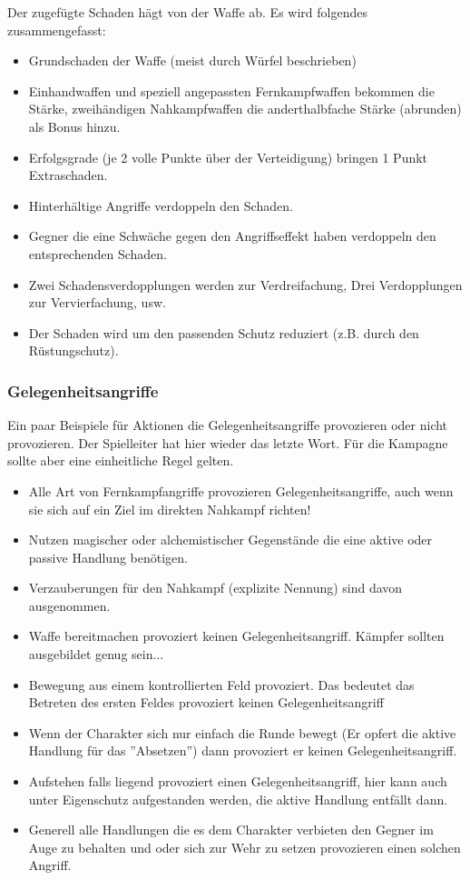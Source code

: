 \documentclass{article}
\begin{document}
Der zugefügte Schaden hägt von der Waffe ab. Es wird folgendes zusammengefasst:

\begin{itemize}
\item Grundschaden der Waffe (meist durch Würfel beschrieben)
\item Einhandwaffen und speziell angepassten Fernkampfwaffen bekommen die Stärke, zweihändigen Nahkampfwaffen die anderthalbfache Stärke (abrunden) als Bonus hinzu.
\item Erfolgsgrade (je 2 volle Punkte über der Verteidigung) bringen 1 Punkt Extraschaden.
\item Hinterhältige Angriffe verdoppeln den Schaden.
\item Gegner die eine Schwäche gegen den Angriffseffekt haben verdoppeln den entsprechenden Schaden.
\item Zwei Schadensverdopplungen werden zur Verdreifachung, Drei Verdopplungen zur Vervierfachung, usw.
\item Der Schaden wird um den passenden Schutz reduziert (z.B. durch den Rüstungschutz).
\end{itemize}

\subsubsection{Gelegenheitsangriffe}

Ein paar Beispiele für Aktionen die Gelegenheitsangriffe provozieren oder nicht provozieren. Der Spielleiter hat hier
wieder das letzte Wort. Für die Kampagne sollte aber eine einheitliche Regel gelten.

\begin{itemize}
\item Alle Art von Fernkampfangriffe provozieren Gelegenheitsangriffe, auch wenn sie sich auf ein Ziel im direkten Nahkampf richten!
\item Nutzen magischer oder alchemistischer Gegenstände die eine aktive oder passive Handlung benötigen.
\item Verzauberungen für den Nahkampf (explizite Nennung) sind davon ausgenommen.
\item Waffe bereitmachen provoziert keinen Gelegenheitsangriff. Kämpfer sollten ausgebildet genug sein...
\item Bewegung aus einem kontrollierten Feld provoziert. Das bedeutet das Betreten des ersten Feldes provoziert keinen Gelegenheitsangriff
\item Wenn der Charakter sich nur einfach die Runde bewegt (Er opfert die aktive Handlung für das ''Absetzen'') dann provoziert er keinen Gelegenheitsangriff.
\item Aufstehen falls liegend provoziert einen Gelegenheitsangriff, hier kann auch unter Eigenschutz aufgestanden werden, die aktive Handlung entfällt dann.
\item Generell alle Handlungen die es dem Charakter verbieten den Gegner im Auge zu behalten und oder sich zur Wehr zu setzen provozieren einen solchen Angriff.
\end{itemize}
\end{document}
